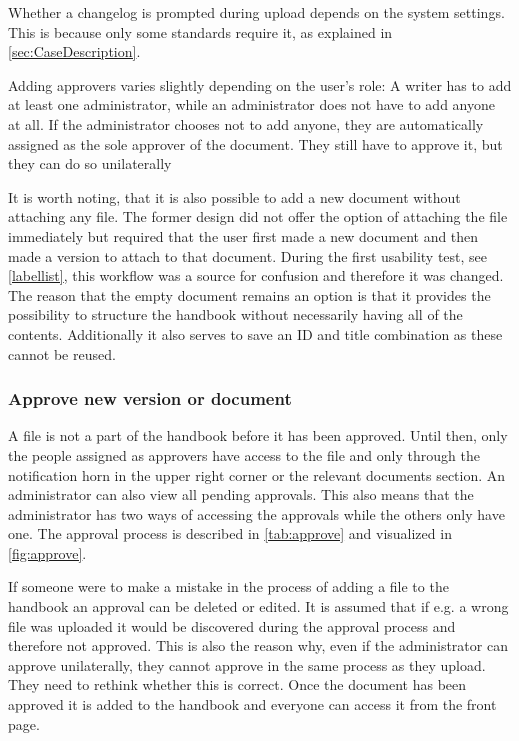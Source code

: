 


Whether a changelog is prompted during upload depends on the system settings.
This is because only some standards require it, as explained in \cref{sec:CaseDescription}.

Adding approvers varies slightly depending on the user's role:
A writer has to add at least one administrator, while an administrator does not have to add anyone at all.
If the administrator chooses not to add anyone, they are automatically assigned as the sole approver of the document.
They still have to approve it, but they can do so unilaterally

It is worth noting, that it is also possible to add a new document without attaching any file.
The former design did not offer the option of attaching the file immediately but required that the user first made a new document and then made a version to attach to that document.
During the first usability test, see \cref{labellist}, this workflow was a source for confusion and therefore it was changed.
The reason that the empty document remains an option is that it provides the possibility to structure the handbook without necessarily having all of the contents.
Additionally it also serves to save an ID and title combination as these cannot be reused.

\subsubsection{Approve new version or document} \label{sec:approve}
A file is not a part of the handbook before it has been approved.
Until then, only the people assigned as approvers have access to the file and only through the notification horn in the upper right corner or the relevant documents section.
An administrator can also view all pending approvals.
This also means that the administrator has two ways of accessing the approvals while the others only have one.
The approval process is described in \cref{tab:approve} and visualized in \cref{fig:approve}.




If someone were to make a mistake in the process of adding a file to the handbook an approval can be deleted or edited.
It is assumed that if e.g. a wrong file was uploaded it would be discovered during the approval process and therefore not approved.
This is also the reason why, even if the administrator can approve unilaterally, they cannot approve in the same process as they upload.
They need to rethink whether this is correct.
Once the document has been approved it is added to the handbook and everyone can access it from the front page.

